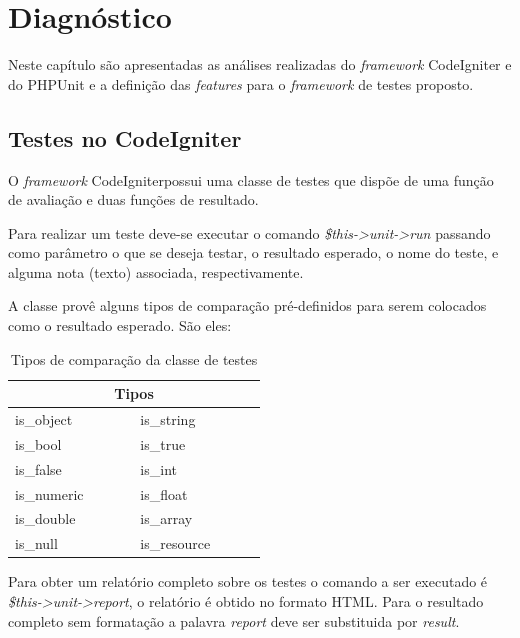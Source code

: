 \chapter{Diagnóstico}

Neste capítulo são apresentadas as análises realizadas do \textit{framework} CodeIgniter e do PHPUnit e a definição das \textit{features} para o \textit{framework} de testes proposto.

    
\section{Testes no CodeIgniter}

O \textit{framework} CodeIgniter\footnotemark possui uma classe de testes que dispõe de uma função de avaliação
e duas funções de resultado. 

Para realizar um teste deve-se executar o comando \textit{\$this->unit->run} passando como parâmetro
o que se deseja testar, o resultado esperado, o nome do teste, e alguma nota (texto) associada, respectivamente.

A classe provê alguns tipos de comparação pré-definidos para serem colocados como o resultado esperado. São eles:

\begin{table}[!h]
\caption{Tipos de comparação da classe de testes}
\label{table:tipos_comparacao}
\centering
\begin{tabular}{|p{0.25\linewidth}|p{0.25\linewidth}|}
  \hline
  \multicolumn{2}{|c|}{\textbf{Tipos}} \\
  \hline			
	is\_object & is\_string \\
  \hline
	is\_bool &	is\_true \\
  \hline
	is\_false & is\_int \\
  \hline
	is\_numeric & is\_float \\
  \hline
	is\_double & is\_array \\
  \hline
	is\_null &	is\_resource \\
  \hline
  \end{tabular}
\end{table}

Para obter um relatório completo sobre os testes o comando a ser executado é \textit{\$this->unit->report}, 
o relatório é obtido no formato HTML. Para o resultado completo sem formatação a palavra \textit{report} deve ser
substituida por \textit{result}.


